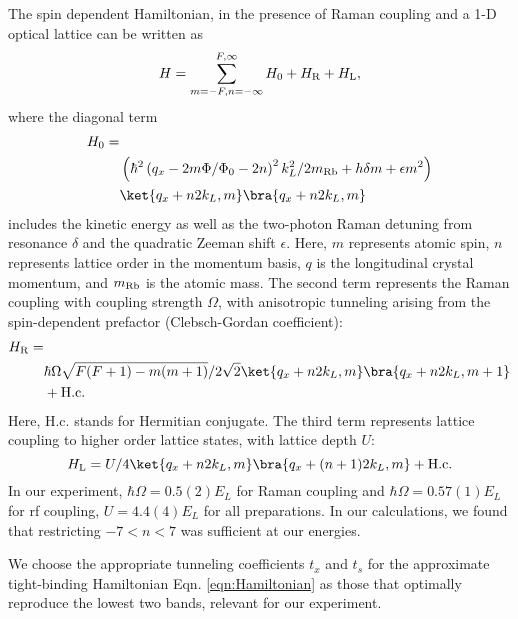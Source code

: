 The spin dependent Hamiltonian, in the presence of Raman coupling and a 1-D optical lattice can be written as
\begin{equation*}
H = \sum _{m=-F,n=-\infty}^{F,\infty}H_{0}+H_{\rm{R}}+H_{\rm{L}},
\end{equation*}
where the diagonal term
\begin{eqnarray*}
H_{0} =&\\
&\left(\hbar^2\left(q_x-2m\Phi/\Phi_0-2n\right)^2 k_L^2/2m_{\rm{Rb}}+h\delta m+\epsilon m^2 \right)\\
&\ket{q_x+n2k_L,m}\bra{q_x+n2k_L,m}
\end{eqnarray*}
includes the kinetic energy as well as the two-photon Raman detuning from resonance $\delta$ and the quadratic Zeeman shift $\epsilon$. Here,  $m$ represents atomic spin, $n$ represents lattice order in the momentum basis, $q$ is the longitudinal crystal momentum, and $m_{\rm{Rb}}$ is the atomic mass.  The second term represents the Raman coupling  with coupling strength $\Omega$, with anisotropic tunneling arising from the spin-dependent prefactor (Clebsch-Gordan coefficient):
\begin{eqnarray*}
H_{\rm{R}} =&\\
&\hbar\Omega\sqrt{F(F+1)-m(m+1)}/2\sqrt{2}\ket{q_x+n2k_L,m}\bra{q_x+n2k_L,m+1}\\
&+\rm{H.c.}
\end{eqnarray*}
Here,  H.c. stands for Hermitian conjugate. The third term represents lattice coupling to higher order lattice states, with lattice depth $U$: 
\begin{equation*}
H_{\rm{L}} = U/4\ket{q_x+n2k_L,m}\bra{q_x+(n+1)2k_L,m} +\rm{H.c.}
\end{equation*}
In our experiment, $\hbar\Omega=0.5(2)E_L$ for Raman coupling and $\hbar\Omega = 0.57(1) E_L$ for rf coupling, $U=4.4(4) E_L$ for all preparations. In our calculations, we found that restricting $-7<n<7$ was sufficient at our energies. 

We choose the appropriate tunneling coefficients $t_x$ and $t_s$ for the approximate tight-binding Hamiltonian Eqn. \ref{eqn:Hamiltonian} as those that optimally reproduce the lowest two bands, relevant for our experiment. 